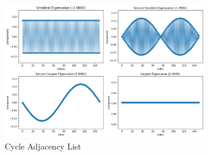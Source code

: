 \documentclass[12pt]{article}
\begin{document}
\begin{enumerate}[leftmargin=\labelsep, label=(\alph*)]
\begin{figure}[H]
            \includegraphics[width=0.8\textwidth]{cycle_A.png}
            \caption{Cycle Adjacency List}
        \end{figure}
        

\end{enumerate}
\end{document}
